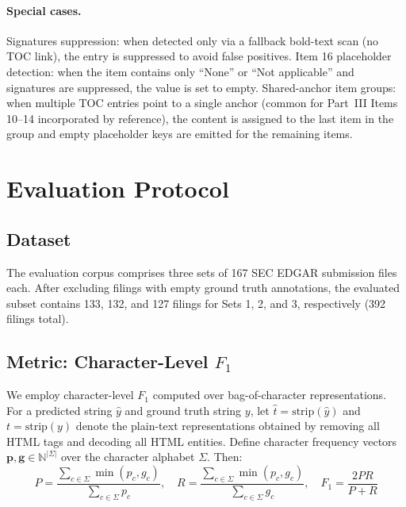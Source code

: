 \documentclass[11pt,a4paper]{article}
\begin{document}
\paragraph{Special cases.}
Signatures suppression: when detected only via a fallback bold-text scan (no TOC link), the entry is suppressed to avoid false positives. Item 16 placeholder detection: when the item contains only ``None'' or ``Not applicable'' and signatures are suppressed, the value is set to empty. Shared-anchor item groups: when multiple TOC entries point to a single anchor (common for Part~III Items 10--14 incorporated by reference), the content is assigned to the last item in the group and empty placeholder keys are emitted for the remaining items.


\section{Evaluation Protocol}\label{sec:eval}

\subsection{Dataset}

The evaluation corpus comprises three sets of 167 SEC EDGAR submission files each. After excluding filings with empty ground truth annotations, the evaluated subset contains 133, 132, and 127 filings for Sets 1, 2, and 3, respectively (392 filings total).

\subsection{Metric: Character-Level $F_1$}

We employ character-level $F_1$ computed over bag-of-character representations. For a predicted string $\hat{y}$ and ground truth string $y$, let $\hat{t} = \text{strip}(\hat{y})$ and $t = \text{strip}(y)$ denote the plain-text representations obtained by removing all HTML tags and decoding all HTML entities. Define character frequency vectors $\boldsymbol{p}, \boldsymbol{g} \in \mathbb{N}^{|\Sigma|}$ over the character alphabet $\Sigma$. Then:
\begin{equation}
P = \frac{\sum_{c \in \Sigma} \min(p_c, g_c)}{\sum_{c \in \Sigma} p_c}, \quad
R = \frac{\sum_{c \in \Sigma} \min(p_c, g_c)}{\sum_{c \in \Sigma} g_c}, \quad
F_1 = \frac{2PR}{P+R}
\end{equation}
\end{document}
